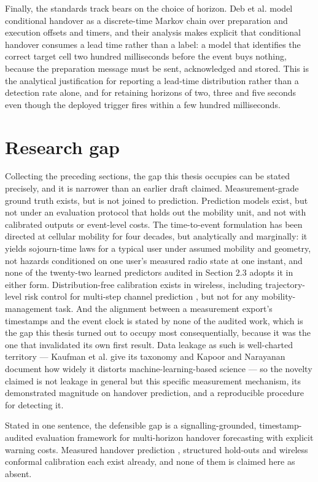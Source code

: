 Finally, the standards track bears on the choice of horizon. Deb et al. \cite{ref31} model conditional handover as a discrete-time Markov chain over preparation and execution offsets and timers, and their analysis makes explicit that conditional handover consumes a lead time rather than a label: a model that identifies the correct target cell two hundred milliseconds before the event buys nothing, because the preparation message must be sent, acknowledged and stored. This is the analytical justification for reporting a lead-time distribution rather than a detection rate alone, and for retaining horizons of two, three and five seconds even though the deployed trigger fires within a few hundred milliseconds.


\section{Research gap}
\label{sec:2_9}

Collecting the preceding sections, the gap this thesis occupies can be stated precisely, and it is narrower than an earlier draft claimed. Measurement-grade ground truth exists, but is not joined to prediction. Prediction models exist, but not under an evaluation protocol that holds out the mobility unit, and not with calibrated outputs or event-level costs. The time-to-event formulation has been directed at cellular mobility for four decades, but analytically and marginally: it yields sojourn-time laws for a typical user under assumed mobility and geometry, not hazards conditioned on one user's measured radio state at one instant, and none of the twenty-two learned predictors audited in Section 2.3 adopts it in either form. Distribution-free calibration exists in wireless, including trajectory-level risk control for multi-step channel prediction \cite{ref55}, but not for any mobility-management task. And the alignment between a measurement export's timestamps and the event clock is stated by none of the audited work, which is the gap this thesis turned out to occupy most consequentially, because it was the one that invalidated its own first result. Data leakage as such is well-charted territory --- Kaufman et al. \cite{ref36} give its taxonomy and Kapoor and Narayanan \cite{ref56} document how widely it distorts machine-learning-based science --- so the novelty claimed is not leakage in general but this specific measurement mechanism, its demonstrated magnitude on handover prediction, and a reproducible procedure for detecting it.

Stated in one sentence, the defensible gap is a signalling-grounded, timestamp-audited evaluation framework for multi-horizon handover forecasting with explicit warning costs. Measured handover prediction \cite{ref5,ref54}, structured hold-outs \cite{ref15,ref46} and wireless conformal calibration \cite{ref19,ref55} each exist already, and none of them is claimed here as absent.


